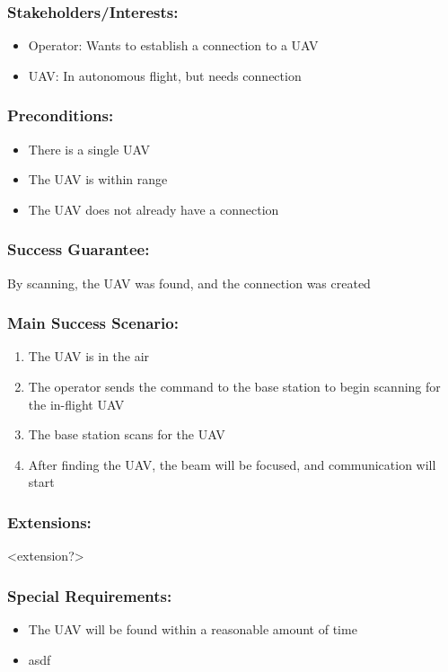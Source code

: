 \documentclass[ProductRequirements.tex]{subfiles}
\begin{document}
	\subsubsection{Stakeholders/Interests:}
	\begin{itemize}\itemsep1pt
		\item Operator: Wants to establish a connection to a UAV
		\item UAV: In autonomous flight, but needs connection
	\end{itemize}
	\subsubsection{Preconditions:}
	\begin{itemize}\itemsep1pt
		\item There is a single UAV
		\item The UAV is within range
		\item The UAV does not already have a connection
	\end{itemize}
	\subsubsection{Success Guarantee:}
	By scanning, the UAV was found, and the connection was created
	\subsubsection{Main Success Scenario:}
	\begin{enumerate}\itemsep1pt
		\item The UAV is in the air
		\item The operator sends the command to the base station to begin scanning for the in-flight UAV
		\item The base station scans for the UAV
		\item After finding the UAV, the beam will be focused, and communication will start
	\end{enumerate}
	\subsubsection{Extensions:}
	<extension?>
	\subsubsection{Special Requirements:}
	\begin{itemize}\itemsep1pt
		\item The UAV will be found within a reasonable amount of time
		\item asdf
	\end{itemize}
\end{document}
